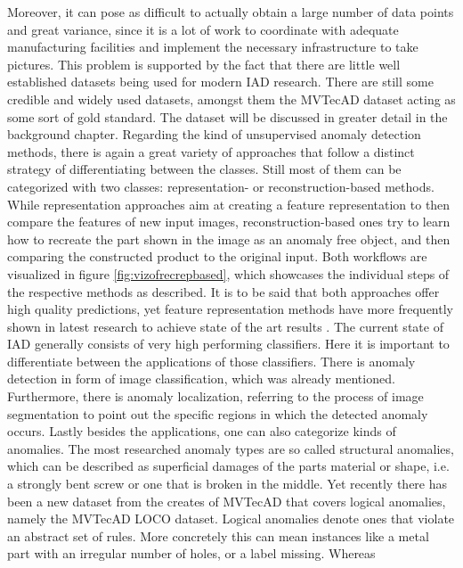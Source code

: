 Moreover, it can pose as difficult to actually obtain a large number of data points and great variance, since it is a lot of work to 
coordinate with adequate manufacturing facilities and implement the necessary infrastructure to take pictures. This problem is supported 
by the fact that there are little well established datasets being used for modern IAD research. There are still some credible and widely used 
datasets, amongst them the MVTecAD \cite{MVTEC_Bergmann_2021} dataset acting as some sort of gold standard. The dataset will be discussed in greater detail 
in the background chapter. Regarding the kind of unsupervised anomaly detection methods, there is again a great variety of approaches that follow a 
distinct strategy of differentiating between the classes. Still most of them can be categorized with two classes: representation- 
or reconstruction-based methods. While representation approaches aim at creating a feature representation to then 
compare the features of new input images, reconstruction-based ones try to learn how to recreate the part shown in the image as an anomaly 
free object, and then comparing the constructed product to the original input. Both workflows are visualized in figure \ref{fig:vizofrecrepbased}, which showcases 
the individual steps of the respective methods as described. It is to be said that both approaches offer high quality predictions, yet 
feature representation methods have more frequently shown in latest research to achieve state of the art results \cite{liu2024deep}. %
\newline
The current state of IAD generally consists of very high performing classifiers. Here it is important to differentiate between the  
applications of those classifiers. There is anomaly detection in form of image classification, which was already mentioned. 
Furthermore, there is anomaly localization, referring to the process of image segmentation to point out the specific regions in which 
the detected anomaly occurs. Lastly besides the applications, one can also categorize kinds of anomalies. The most researched anomaly types 
are so called structural anomalies, which can be described as superficial damages of the parts material or shape, i.e. a strongly 
bent screw or one that is broken in the middle. Yet recently there has been a new dataset from the creates of MVTecAD that covers logical 
anomalies, namely the MVTecAD LOCO \cite{LOCODentsAndScratchesBergmann2022} dataset. Logical anomalies denote ones that violate an abstract 
set of rules. More concretely this can mean instances like a metal part with an irregular number of holes, or a label missing. Whereas 
